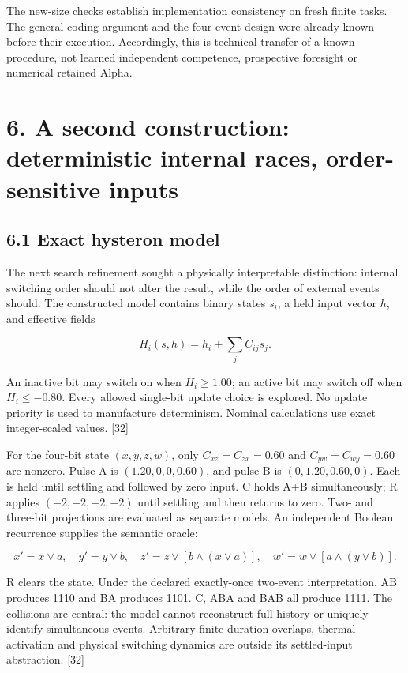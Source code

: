 \documentclass[
  11pt,
]{article}
\begin{document}
The new-size checks establish implementation consistency on fresh finite
tasks. The general coding argument and the four-event design were
already known before their execution. Accordingly, this is technical
transfer of a known procedure, not learned independent competence,
prospective foresight or numerical retained Alpha.

\hypertarget{a-second-construction-deterministic-internal-races-order-sensitive-inputs}{%
\section{6. A second construction: deterministic internal races,
order-sensitive
inputs}\label{a-second-construction-deterministic-internal-races-order-sensitive-inputs}}

\hypertarget{exact-hysteron-model}{%
\subsection{6.1 Exact hysteron model}\label{exact-hysteron-model}}

The next search refinement sought a physically interpretable
distinction: internal switching order should not alter the result, while
the order of external events should. The constructed model contains
binary states \(s_i\), a held input vector \(h\), and effective fields

\[
H_i(s,h)=h_i+\sum_j C_{ij}s_j.
\]

An inactive bit may switch on when \(H_i\geq1.00\); an active bit may
switch off when \(H_i\leq-0.80\). Every allowed single-bit update choice
is explored. No update priority is used to manufacture determinism.
Nominal calculations use exact integer-scaled values. {[}32{]}

For the four-bit state \((x,y,z,w)\), only \(C_{xz}=C_{zx}=0.60\) and
\(C_{yw}=C_{wy}=0.60\) are nonzero. Pulse A is \((1.20,0,0,0.60)\), and
pulse B is \((0,1.20,0.60,0)\). Each is held until settling and followed
by zero input. C holds A+B simultaneously; R applies \((-2,-2,-2,-2)\)
until settling and then returns to zero. Two- and three-bit projections
are evaluated as separate models. An independent Boolean recurrence
supplies the semantic oracle:

\[
x'=x\lor a,\quad y'=y\lor b,\quad
z'=z\lor[b\land(x\lor a)],\quad
w'=w\lor[a\land(y\lor b)].
\]

R clears the state. Under the declared exactly-once two-event
interpretation, AB produces 1110 and BA produces 1101. C, ABA and BAB
all produce 1111. The collisions are central: the model cannot
reconstruct full history or uniquely identify simultaneous events.
Arbitrary finite-duration overlaps, thermal activation and physical
switching dynamics are outside its settled-input abstraction. {[}32{]}
\end{document}
